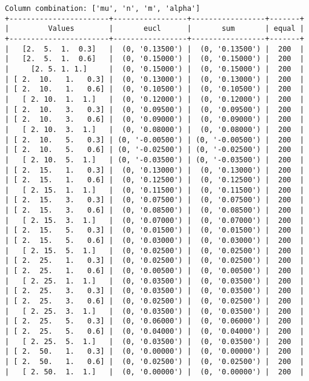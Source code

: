 \documentclass{article}
\begin{document}
\begin{verbatim}
Column combination: ['mu', 'n', 'm', 'alpha']
+-----------------------+-----------------+-----------------+-------+
|         Values        |       eucl      |       sum       | equal |
+-----------------------+-----------------+-----------------+-------+
|   [2.  5.  1.  0.3]   |  (0, '0.13500') |  (0, '0.13500') |  200  |
|   [2.  5.  1.  0.6]   |  (0, '0.15000') |  (0, '0.15000') |  200  |
|     [2. 5. 1. 1.]     |  (0, '0.15000') |  (0, '0.15000') |  200  |
| [ 2.  10.   1.   0.3] |  (0, '0.13000') |  (0, '0.13000') |  200  |
| [ 2.  10.   1.   0.6] |  (0, '0.10500') |  (0, '0.10500') |  200  |
|   [ 2. 10.  1.  1.]   |  (0, '0.12000') |  (0, '0.12000') |  200  |
| [ 2.  10.   3.   0.3] |  (0, '0.09500') |  (0, '0.09500') |  200  |
| [ 2.  10.   3.   0.6] |  (0, '0.09000') |  (0, '0.09000') |  200  |
|   [ 2. 10.  3.  1.]   |  (0, '0.08000') |  (0, '0.08000') |  200  |
| [ 2.  10.   5.   0.3] | (0, '-0.00500') | (0, '-0.00500') |  200  |
| [ 2.  10.   5.   0.6] | (0, '-0.02500') | (0, '-0.02500') |  200  |
|   [ 2. 10.  5.  1.]   | (0, '-0.03500') | (0, '-0.03500') |  200  |
| [ 2.  15.   1.   0.3] |  (0, '0.13000') |  (0, '0.13000') |  200  |
| [ 2.  15.   1.   0.6] |  (0, '0.12500') |  (0, '0.12500') |  200  |
|   [ 2. 15.  1.  1.]   |  (0, '0.11500') |  (0, '0.11500') |  200  |
| [ 2.  15.   3.   0.3] |  (0, '0.07500') |  (0, '0.07500') |  200  |
| [ 2.  15.   3.   0.6] |  (0, '0.08500') |  (0, '0.08500') |  200  |
|   [ 2. 15.  3.  1.]   |  (0, '0.07000') |  (0, '0.07000') |  200  |
| [ 2.  15.   5.   0.3] |  (0, '0.01500') |  (0, '0.01500') |  200  |
| [ 2.  15.   5.   0.6] |  (0, '0.03000') |  (0, '0.03000') |  200  |
|   [ 2. 15.  5.  1.]   |  (0, '0.02500') |  (0, '0.02500') |  200  |
| [ 2.  25.   1.   0.3] |  (0, '0.02500') |  (0, '0.02500') |  200  |
| [ 2.  25.   1.   0.6] |  (0, '0.00500') |  (0, '0.00500') |  200  |
|   [ 2. 25.  1.  1.]   |  (0, '0.03500') |  (0, '0.03500') |  200  |
| [ 2.  25.   3.   0.3] |  (0, '0.03500') |  (0, '0.03500') |  200  |
| [ 2.  25.   3.   0.6] |  (0, '0.02500') |  (0, '0.02500') |  200  |
|   [ 2. 25.  3.  1.]   |  (0, '0.03500') |  (0, '0.03500') |  200  |
| [ 2.  25.   5.   0.3] |  (0, '0.06000') |  (0, '0.06000') |  200  |
| [ 2.  25.   5.   0.6] |  (0, '0.04000') |  (0, '0.04000') |  200  |
|   [ 2. 25.  5.  1.]   |  (0, '0.03500') |  (0, '0.03500') |  200  |
| [ 2.  50.   1.   0.3] |  (0, '0.00000') |  (0, '0.00000') |  200  |
| [ 2.  50.   1.   0.6] |  (0, '0.02500') |  (0, '0.02500') |  200  |
|   [ 2. 50.  1.  1.]   |  (0, '0.00000') |  (0, '0.00000') |  200  |

\end{verbatim}
\end{document}
